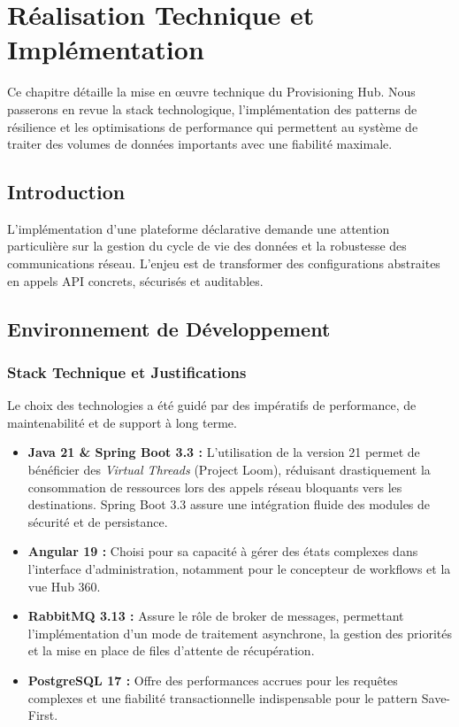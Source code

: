 \chapter{Réalisation Technique et Implémentation}
\label{chap:realisation}

Ce chapitre détaille la mise en œuvre technique du Provisioning Hub. Nous passerons en revue la stack technologique, l'implémentation des patterns de résilience et les optimisations de performance qui permettent au système de traiter des volumes de données importants avec une fiabilité maximale.

\section{Introduction}
L'implémentation d'une plateforme déclarative demande une attention particulière sur la gestion du cycle de vie des données et la robustesse des communications réseau. L'enjeu est de transformer des configurations abstraites en appels API concrets, sécurisés et auditables.

\section{Environnement de Développement}
\label{sec:environnement_dev}

\subsection{Stack Technique et Justifications}
Le choix des technologies a été guidé par des impératifs de performance, de maintenabilité et de support à long terme.
\begin{itemize}
    \item \textbf{Java 21 \& Spring Boot 3.3 :} L'utilisation de la version 21 permet de bénéficier des \textit{Virtual Threads} (Project Loom), réduisant drastiquement la consommation de ressources lors des appels réseau bloquants vers les destinations. Spring Boot 3.3 assure une intégration fluide des modules de sécurité et de persistance.
    \item \textbf{Angular 19 :} Choisi pour sa capacité à gérer des états complexes dans l'interface d'administration, notamment pour le concepteur de workflows et la vue Hub 360.
    \item \textbf{RabbitMQ 3.13 :} Assure le rôle de broker de messages, permettant l'implémentation d'un mode de traitement asynchrone, la gestion des priorités et la mise en place de files d'attente de récupération.
    \item \textbf{PostgreSQL 17 :} Offre des performances accrues pour les requêtes complexes et une fiabilité transactionnelle indispensable pour le pattern Save-First.
\end{itemize}

